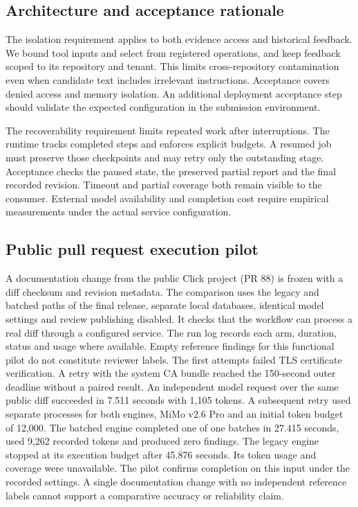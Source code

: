 \documentclass[journal,compsoc]{IEEEtran}
\begin{document}
\subsection{Architecture and acceptance rationale}
The isolation requirement applies to both evidence access and historical feedback. We bound tool inputs and select from registered operations, and keep feedback scoped to its repository and tenant. This limits cross-repository contamination even when candidate text includes irrelevant instructions. Acceptance covers denied access and memory isolation. An additional deployment acceptance step should validate the expected configuration in the submission environment.

The recoverability requirement limits repeated work after interruptions. The runtime tracks completed steps and enforces explicit budgets. A resumed job must preserve those checkpoints and may retry only the outstanding stage. Acceptance checks the paused state, the preserved partial report and the final recorded revision. Timeout and partial coverage both remain visible to the consumer. External model availability and completion cost require empirical measurements under the actual service configuration.

\subsection{Public pull request execution pilot}
A documentation change from the public Click project (PR 88) is frozen with a diff checksum and revision metadata. The comparison uses the legacy and batched paths of the final release, separate local databases, identical model settings and review publishing disabled. It checks that the workflow can process a real diff through a configured service. The run log records each arm, duration, status and usage where available. Empty reference findings for this functional pilot do not constitute reviewer labels. The first attempts failed TLS certificate verification. A retry with the system CA bundle reached the 150-second outer deadline without a paired result. An independent model request over the same public diff succeeded in 7.511 seconds with 1,105 tokens. A subsequent retry used separate processes for both engines, MiMo v2.6 Pro and an initial token budget of 12,000. The batched engine completed one of one batches in 27.415 seconds, used 9,262 recorded tokens and produced zero findings. The legacy engine stopped at its execution budget after 45.876 seconds. Its token usage and coverage were unavailable. The pilot confirms completion on this input under the recorded settings. A single documentation change with no independent reference labels cannot support a comparative accuracy or reliability claim.
\end{document}
